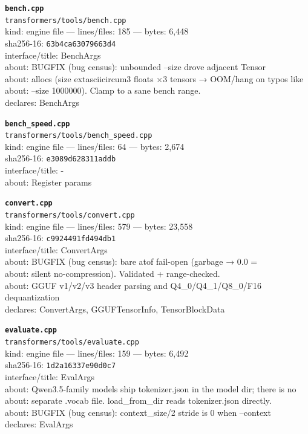 \noindent\textbf{\texttt{bench.cpp}}\\
\texttt{transformers/tools/bench.cpp}\\
kind: engine file --- lines/files: 185 --- bytes: 6,448\\
sha256-16: \texttt{63b4ca63079663d4}\\
interface/title: BenchArgs\\
about: BUGFIX (bug census): unbounded --size drove adjacent Tensor\\
about: allocs (size	extasciicircum{}3 floats ×3 tensors → OOM/hang on typos like\\
about: --size 1000000). Clamp to a sane bench range.\\
declares: BenchArgs\\
\vspace*{6.0pt}
\newpage

\noindent\textbf{\texttt{bench\_speed.cpp}}\\
\texttt{transformers/tools/bench\_speed.cpp}\\
kind: engine file --- lines/files: 64 --- bytes: 2,674\\
sha256-16: \texttt{e3089d628311addb}\\
interface/title: -\\
about: Register params\\
\vspace*{6.0pt}

\noindent\textbf{\texttt{convert.cpp}}\\
\texttt{transformers/tools/convert.cpp}\\
kind: engine file --- lines/files: 579 --- bytes: 23,558\\
sha256-16: \texttt{c9924491fd494db1}\\
interface/title: ConvertArgs\\
about: BUGFIX (bug census): bare atof fail-open (garbage → 0.0 =\\
about: silent no-compression). Validated + range-checked.\\
about: GGUF v1/v2/v3 header parsing and Q4\_0/Q4\_1/Q8\_0/F16 dequantization\\
declares: ConvertArgs, GGUFTensorInfo, TensorBlockData\\
\vspace*{6.0pt}

\noindent\textbf{\texttt{evaluate.cpp}}\\
\texttt{transformers/tools/evaluate.cpp}\\
kind: engine file --- lines/files: 159 --- bytes: 6,492\\
sha256-16: \texttt{1d2a16337e90d0c7}\\
interface/title: EvalArgs\\
about: Qwen3.5-family models ship tokenizer.json in the model dir; there is no\\
about: separate .vocab file. load\_from\_dir reads tokenizer.json directly.\\
about: BUGFIX (bug census): context\_size/2 stride is 0 when --context\\
declares: EvalArgs\\
\vspace*{6.0pt}

